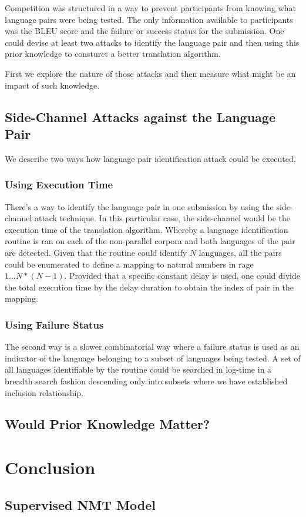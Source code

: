 \documentclass[]{article}
\begin{document}
Competition was structured in a way to prevent participants from knowing what language pairs were being tested.
The only information available to participants was the BLEU score and the failure or success status for the submission.
One could devise at least two attacks to identify the language pair and then using this prior knowledge to consturct a better translation algorithm.

First we explore the nature of those attacks and then measure what might be an impact of such knowledge.

\subsection{Side-Channel Attacks against the Language Pair}
\label{sect:attack}

We describe two ways how language pair identification attack could be executed.

\subsubsection{Using Execution Time}

There's a way to identify the language pair in one submission by using the side-channel attack technique.
In this particular case, the side-channel would be the execution time of the translation algorithm.
Whereby a language identification routine is ran on each of the non-parallel corpora and both languages of the pair are detected.
Given that the routine could identify $N$ languages, all the pairs could be enumerated to define a mapping to natural numbers in rage $1\dots N*(N-1)$.
Provided that a specific constant delay is used, one could divide the total execution time by the delay duration to obtain the index of pair in the mapping.

\subsubsection{Using Failure Status}

The second way is a slower combinatorial way where a failure status is used as an indicator of the language belonging to a subset of languages being tested.
A set of all languages identifiable by the routine could be searched in log-time in a breadth search fashion descending only into subsets where we have established inclusion relationship.

\subsection{Would Prior Knowledge Matter?}
\label{sect:prior}

\section{Conclusion}

\small




\begin{appendices}
\section{Supervised NMT Model}
\label{appendix:supervised}

\end{appendices}
\end{document}
